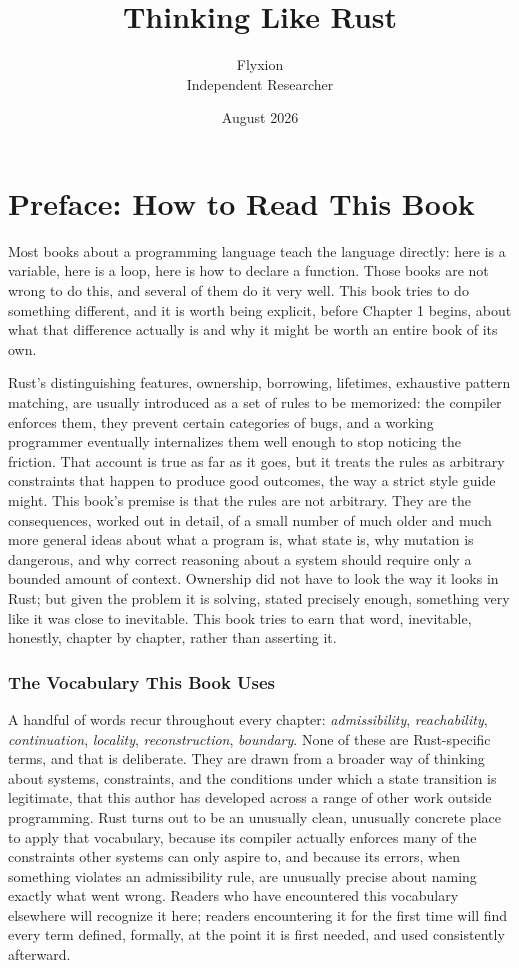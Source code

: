 \documentclass[11pt]{book}
\title{Thinking Like Rust}
\author{Flyxion \\ Independent Researcher}
\date{August 2026}
\begin{document}
\maketitle

\chapter*{Preface: How to Read This Book}

Most books about a programming language teach the language directly: here is a variable, here is a loop, here is how to declare a function. Those books are not wrong to do this, and several of them do it very well. This book tries to do something different, and it is worth being explicit, before Chapter 1 begins, about what that difference actually is and why it might be worth an entire book of its own.

Rust's distinguishing features, ownership, borrowing, lifetimes, exhaustive pattern matching, are usually introduced as a set of rules to be memorized: the compiler enforces them, they prevent certain categories of bugs, and a working programmer eventually internalizes them well enough to stop noticing the friction. That account is true as far as it goes, but it treats the rules as arbitrary constraints that happen to produce good outcomes, the way a strict style guide might. This book's premise is that the rules are not arbitrary. They are the consequences, worked out in detail, of a small number of much older and much more general ideas about what a program is, what state is, why mutation is dangerous, and why correct reasoning about a system should require only a bounded amount of context. Ownership did not have to look the way it looks in Rust; but given the problem it is solving, stated precisely enough, something very like it was close to inevitable. This book tries to earn that word, inevitable, honestly, chapter by chapter, rather than asserting it.

\subsection*{The Vocabulary This Book Uses}

A handful of words recur throughout every chapter: \emph{admissibility}, \emph{reachability}, \emph{continuation}, \emph{locality}, \emph{reconstruction}, \emph{boundary}. None of these are Rust-specific terms, and that is deliberate. They are drawn from a broader way of thinking about systems, constraints, and the conditions under which a state transition is legitimate, that this author has developed across a range of other work outside programming. Rust turns out to be an unusually clean, unusually concrete place to apply that vocabulary, because its compiler actually enforces many of the constraints other systems can only aspire to, and because its errors, when something violates an admissibility rule, are unusually precise about naming exactly what went wrong. Readers who have encountered this vocabulary elsewhere will recognize it here; readers encountering it for the first time will find every term defined, formally, at the point it is first needed, and used consistently afterward.
\end{document}
